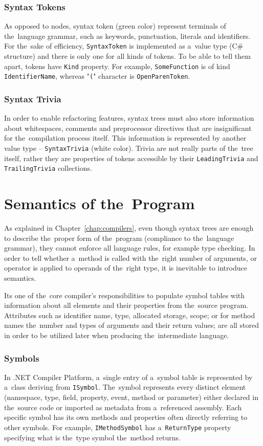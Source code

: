 \documentclass[
  digital, %
  table,   %
  lof,     %
  lot,     %
  oneside,
]{fithesis3}
\begin{document}
\subsubsection{\textbf{Syntax Tokens}}
As opposed to nodes, syntax token (green color) represent terminals of the~language grammar, such as keywords, punctuation, literals and identifiers. For the~sake of efficiency, \texttt{SyntaxToken} is implemented as a~value type (C\# structure) and there is only one for all kinds of tokens. To be able to tell them apart, tokens have \texttt{Kind} property. For example, \texttt{SomeFunction} is of kind \texttt{IdentifierName}, whereas "\texttt{(}" character is \texttt{OpenParenToken}.

\subsubsection{\textbf{Syntax Trivia}}
In order to enable refactoring features, syntax trees must also store information about whitespaces, comments and preprocessor directives that are insignificant for the~compilation process itself. This information is represented by another value type -- \texttt{SyntaxTrivia} (white color). Trivia are not really parts of the~tree itself, rather they are properties of tokens accessible by their \texttt{LeadingTrivia} and \texttt{TrailingTrivia} collections.

\section{Semantics of the~Program}
As explained in Chapter~\ref{chap:compilers}, even though syntax trees are enough to describe the~proper form of the~program (compliance to the~language grammar), they cannot enforce all language rules, for example type checking. In order to tell whether a~method is called with the~right number of arguments, or operator is applied to operands of the~right type, it is inevitable to introduce semantics. 

Its one of the~core compiler's responsibilities to populate symbol tables with information about all elements and their properties from the~source program. Attributes such as identifier name, type, allocated storage, scope; or for method names the~number and types of arguments and their return values; are all stored in order to be utilized later when producing the~intermediate language.

\subsubsection{\textbf{Symbols}}
In .NET Compiler Platform, a~single entry of a~symbol table is represented by a~class deriving from \texttt{ISymbol}. The~symbol represents every distinct element (namespace, type, field, property, event, method or parameter) either declared in the~source code or imported as metadata from a~referenced assembly. Each specific symbol has its own methods and properties often directly referring to other symbols. For example, \texttt{IMethodSymbol} has a~\texttt{ReturnType} property specifying what is the~type symbol the~method returns.
\end{document}
